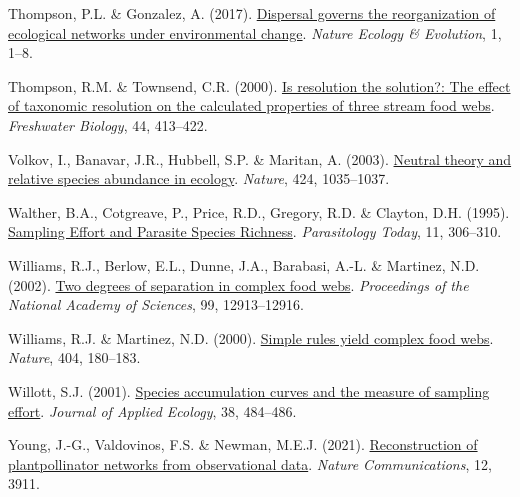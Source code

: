 \documentclass[11pt]{article}
\newlength{\cslhangindent}
\newenvironment{CSLReferences}[3] %
 {%
  \setlength{\parindent}{0pt}
  \ifodd #1 \everypar{\setlength{\hangindent}{\cslhangindent}}\ignorespaces\fi
  \ifnum #2 > 0
  \setlength{\parskip}{#2\baselineskip}
  \fi
 }%
 {}
\begin{document}
\begin{CSLReferences}{1}{0}
\leavevmode{}%
Thompson, P.L. \& Gonzalez, A. (2017).
\href{https://doi.org/10.1038/s41559-017-0162}{Dispersal governs the
reorganization of ecological networks under environmental change}.
\emph{Nature Ecology \& Evolution}, 1, 1--8.

\leavevmode{}%
Thompson, R.M. \& Townsend, C.R. (2000).
\href{https://doi.org/10.1046/j.1365-2427.2000.00579.x}{Is resolution
the solution?: The effect of taxonomic resolution on the calculated
properties of three stream food webs}. \emph{Freshwater Biology}, 44,
413--422.

\leavevmode{}%
Volkov, I., Banavar, J.R., Hubbell, S.P. \& Maritan, A. (2003).
\href{https://doi.org/10.1038/nature01883}{Neutral theory and relative
species abundance in ecology}. \emph{Nature}, 424, 1035--1037.

\leavevmode{}%
Walther, B.A., Cotgreave, P., Price, R.D., Gregory, R.D. \& Clayton,
D.H. (1995).
\href{https://doi.org/10.1016/0169-4758(95)80047-6}{Sampling Effort and
Parasite Species Richness}. \emph{Parasitology Today}, 11, 306--310.

\leavevmode{}%
Williams, R.J., Berlow, E.L., Dunne, J.A., Barabasi, A.-L. \& Martinez,
N.D. (2002). \href{https://doi.org/10.1073/pnas.192448799}{Two degrees
of separation in complex food webs}. \emph{Proceedings of the National
Academy of Sciences}, 99, 12913--12916.

\leavevmode{}%
Williams, R.J. \& Martinez, N.D. (2000).
\href{https://doi.org/10.1038/35004572}{Simple rules yield complex food
webs}. \emph{Nature}, 404, 180--183.

\leavevmode{}%
Willott, S.J. (2001).
\href{https://doi.org/10.1046/j.1365-2664.2001.00589.x}{Species
accumulation curves and the measure of sampling effort}. \emph{Journal
of Applied Ecology}, 38, 484--486.

\leavevmode{}%
Young, J.-G., Valdovinos, F.S. \& Newman, M.E.J. (2021).
\href{https://doi.org/10.1038/s41467-021-24149-x}{Reconstruction of
plantpollinator networks from observational data}. \emph{Nature
Communications}, 12, 3911.

\end{CSLReferences}
\end{document}
